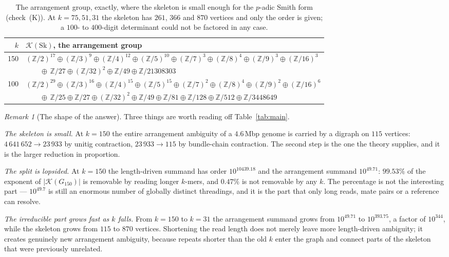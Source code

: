 \documentclass[11pt]{article}
\theoremstyle{plain}
\theoremstyle{definition}
\theoremstyle{remark}
\newtheorem{remark}[theorem]{Remark}
\newcommand{\Z}{\mathbb{Z}}
\newcommand{\K}{\mathcal{K}}
\newcommand{\Sk}{\mathrm{Sk}}
\begin{document}
\begin{table}[ht]
\centering\footnotesize
\begin{tabular}{rl}
\toprule
$k$ & $\K(\Sk)$, the arrangement group\\
\midrule
150 & $(\Z/2)^{17}\oplus(\Z/3)^{9}\oplus(\Z/4)^{12}\oplus(\Z/5)^{10}\oplus(\Z/7)^{3}
\oplus(\Z/8)^{4}\oplus(\Z/9)^{3}\oplus(\Z/16)^{3}$\\
    & $\qquad\oplus\,\Z/27\oplus(\Z/32)^{2}\oplus\Z/49\oplus\Z/21308303$\\[2pt]
100 & $(\Z/2)^{29}\oplus(\Z/3)^{16}\oplus(\Z/4)^{15}\oplus(\Z/5)^{15}\oplus(\Z/7)^{2}
\oplus(\Z/8)^{4}\oplus(\Z/9)^{2}\oplus(\Z/16)^{6}$\\
    & $\qquad\oplus\,\Z/25\oplus\Z/27\oplus(\Z/32)^{2}\oplus\Z/49\oplus\Z/81
\oplus\Z/128\oplus\Z/512\oplus\Z/3448649$\\
\bottomrule
\end{tabular}
\caption{The arrangement group, exactly, where the skeleton is small enough for the
$p$-adic Smith form (check~(K)). At $k=75,51,31$ the skeleton has $261$, $366$ and $870$
vertices and only the order is given; a $100$- to $400$-digit determinant could not be
factored in any case.}
\label{tab:groups}
\end{table}

\begin{remark}[The shape of the answer]\label{rem:shape}
Three things are worth reading off Table~\ref{tab:main}.

\emph{The skeleton is small.} At $k=150$ the entire arrangement ambiguity of a
$4.6$\,Mbp genome is carried by a digraph on $115$ vertices: $4\,641\,652\to23\,933$ by
unitig contraction, $23\,933\to115$ by bundle-chain contraction. The second step is the
one the theory supplies, and it is the larger reduction in proportion.

\emph{The split is lopsided.} At $k=150$ the length-driven summand has order
$10^{10439.18}$ and the arrangement summand $10^{49.71}$: $99.53\%$ of the exponent of
$|\K(G_{150})|$ is removable by reading longer $k$-mers, and $0.47\%$ is not removable by
any $k$. The percentage is not the interesting part --- $10^{49.7}$ is still an enormous
number of globally distinct threadings, and it is the part that only long reads, mate
pairs or a reference can resolve.

\emph{The irreducible part grows fast as $k$ falls.} From $k=150$ to $k=31$ the
arrangement summand grows from $10^{49.71}$ to $10^{393.75}$, a factor of $10^{344}$,
while the skeleton grows from $115$ to $870$ vertices. Shortening the read length does
not merely leave more length-driven ambiguity; it creates genuinely new arrangement
ambiguity, because repeats shorter than the old $k$ enter the graph and connect parts of
the skeleton that were previously unrelated.
\end{remark}
\end{document}
